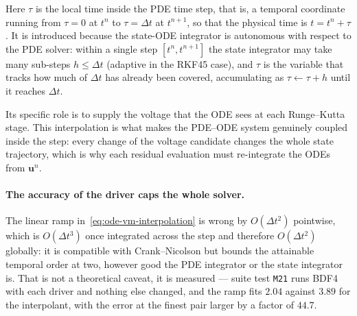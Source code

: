 \documentclass[11pt,a4paper]{article}
\newcommand{\code}[1]{\texttt{\small #1}}
\begin{document}
Here $\tau$ is the local time inside the PDE time step, that is, a temporal
coordinate running from $\tau=0$ at $t^n$ to $\tau=\Delta t$ at $t^{n+1}$, so
that the physical time is $t=t^n+\tau$. It is introduced because the state-ODE
integrator is autonomous with respect to the PDE solver: within a single step
$[t^n,t^{n+1}]$ the state integrator may take many sub-steps $h\le\Delta t$
(adaptive in the RKF45 case), and $\tau$ is the variable that tracks how
much of $\Delta t$ has already been covered, accumulating as
$\tau\leftarrow\tau+h$ until it reaches $\Delta t$.

Its specific role is to supply the voltage that the ODE sees at each
Runge--Kutta stage. This interpolation is what makes the PDE--ODE system
genuinely coupled inside the step: every change of the voltage candidate changes
the whole state trajectory, which is why each residual evaluation must
re-integrate the ODEs from $\mathbf{u}^n$.

\paragraph{The accuracy of the driver caps the whole solver.} The linear ramp
in~\eqref{eq:ode-vm-interpolation} is wrong by $O(\Delta t^2)$ pointwise, which
is $O(\Delta t^3)$ once integrated across the step and therefore $O(\Delta t^2)$
globally: it is compatible with Crank--Nicolson but bounds the attainable
temporal order at two, however good the PDE integrator or the state integrator
is. That is not a theoretical caveat, it is measured --- suite test \code{M21}
runs BDF4 with each driver and nothing else changed, and the ramp fits
$\mathbf{2.04}$ against $\mathbf{3.89}$ for the interpolant, with the error at
the finest pair larger by a factor of $44.7$.
\end{document}
